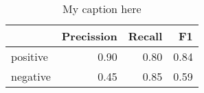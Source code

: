 \begin{table}[!ht]
\centering
\begin{tabular}{lrrr}
\toprule
{} &  Precission &  Recall &   F1 \\
\midrule
positive &        0.90 &    0.80 & 0.84 \\
negative &        0.45 &    0.85 & 0.59 \\
\bottomrule
\end{tabular}
\caption{My caption here}
\label{tab:POLARITY-ocd-combined-F1}
\end{table}